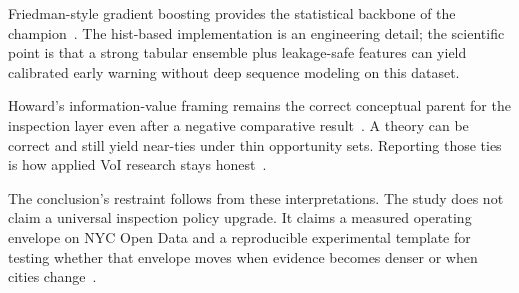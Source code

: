 Friedman-style gradient boosting provides the statistical backbone of the champion~\cite{Friedman2001}. The hist-based implementation is an engineering detail; the scientific point is that a strong tabular ensemble plus leakage-safe features can yield calibrated early warning without deep sequence modeling on this dataset.

Howard's information-value framing remains the correct conceptual parent for the inspection layer even after a negative comparative result~\cite{Howard1966}. A theory can be correct and still yield near-ties under thin opportunity sets. Reporting those ties is how applied VoI research stays honest~\cite{Memarzadeh2016,Song2021}.

The conclusion's restraint follows from these interpretations. The study does not claim a universal inspection policy upgrade. It claims a measured operating envelope on NYC Open Data and a reproducible experimental template for testing whether that envelope moves when evidence becomes denser or when cities change~\cite{Woldesenbet2016,Egwim2021,Luu2009}.
